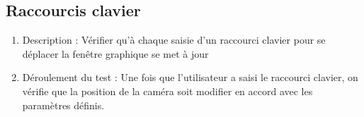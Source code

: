 \documentclass[12pt]{report}
\begin{document}
\subsection{Raccourcis clavier}
\begin{enumerate}
    \item Description : Vérifier qu'à chaque saisie d'un raccourci clavier pour se déplacer la fenêtre graphique se met à jour
    \item Déroulement du test : Une fois que l'utilisateur a saisi le raccourci clavier, on vérifie que la position de la caméra soit modifier en accord avec les paramètres définis.
\end{enumerate}



\end{document}
